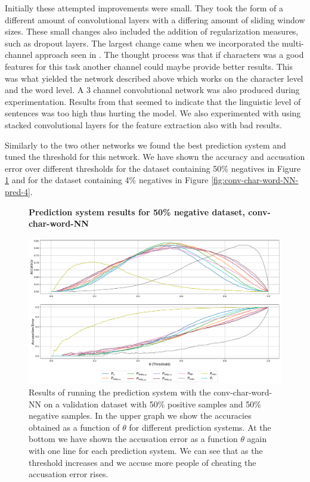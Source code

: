 Initially these attempted improvements were small. They took the form of a
different amount of convolutional layers with a differing amount of sliding
window sizes. These small changes also included the addition of regularization
measures, such as dropout layers. The largest change came when we incorporated
the multi-channel approach seen in \cite{DBLP:journals/corr/RuderGB16c}. The
thought process was that if characters was a good features for this task another
channel could maybe provide better results. This was what yielded the network
described above which works on the character level and the word level. A 3
channel convolutional network was also produced during experimentation. Results
from that seemed to indicate that the linguistic level of sentences was too high
thus hurting the model. We also experimented with using stacked convolutional
layers for the feature extraction also with bad results.

Similarly to the two other networks we found the best prediction system and
tuned the threshold for this network. We have shown the accuracy and accusation
error over different thresholds for the dataset containing 50\% negatives in
Figure \ref{fig:conv-char-word-NN-pred-50} and for the dataset containing 4\%
negatives in Figure \ref{fig:conv-char-word-NN-pred-4}.

\begin{figure}
    \centering
    \textbf{Prediction system results for 50\% negative dataset, \gls{conv-char-word-NN}}\par\medskip
    \includegraphics[scale=0.33]{./pictures/experiments/conv_char_word_nn/prediction_system_50}
    \caption{Results of running the prediction system with the
        \gls{conv-char-word-NN} on a validation dataset with 50\% positive
        samples and 50\% negative samples. In the upper graph we show the
        accuracies obtained as a function of $\theta$ for different prediction
        systems. At the bottom we have shown the accusation error as a function
        $\theta$ again with one line for each prediction system. We can see that
        as the threshold increases and we accuse more people of cheating the
        accusation error rises.}
    \label{fig:conv-char-word-NN-pred-50}
\end{figure}

